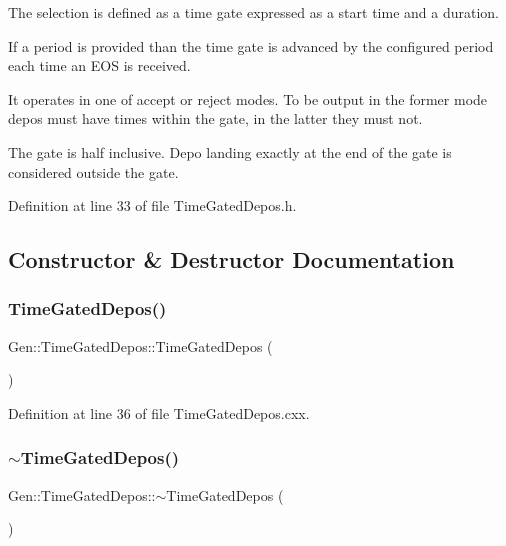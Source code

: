 The selection is defined as a time gate expressed as a start time and a duration.

If a period is provided than the time gate is advanced by the configured period each time an E\+OS is received.

It operates in one of accept or reject modes. To be output in the former mode depos must have times within the gate, in the latter they must not.

The gate is half inclusive. Depo landing exactly at the end of the gate is considered outside the gate. 

Definition at line 33 of file Time\+Gated\+Depos.\+h.



\subsection{Constructor \& Destructor Documentation}
\mbox{\label{class_wire_cell_1_1_gen_1_1_time_gated_depos_ae2474173c20658bf9cd2a00005e6e006}} 
\subsubsection{\texorpdfstring{Time\+Gated\+Depos()}{TimeGatedDepos()}}
{\footnotesize\ttfamily Gen\+::\+Time\+Gated\+Depos\+::\+Time\+Gated\+Depos (\begin{DoxyParamCaption}{ }\end{DoxyParamCaption})}



Definition at line 36 of file Time\+Gated\+Depos.\+cxx.

\mbox{\label{class_wire_cell_1_1_gen_1_1_time_gated_depos_a6a38f6c111683a7ee885db4213413c95}} 
\subsubsection{\texorpdfstring{$\sim$\+Time\+Gated\+Depos()}{~TimeGatedDepos()}}
{\footnotesize\ttfamily Gen\+::\+Time\+Gated\+Depos\+::$\sim$\+Time\+Gated\+Depos (\begin{DoxyParamCaption}{ }\end{DoxyParamCaption})\hspace{0.3cm}{\ttfamily [virtual]}}



